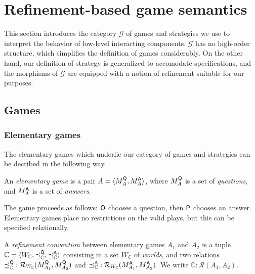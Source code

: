 \section{Refinement-based game semantics}

This section introduces the category $\mathcal{G}$ of games and strategies
we use to interpret the behavior of low-level interacting components.
$\mathcal{G}$ has no high-order structure,
which simplifies the definition of games considerably.
On the other hand,
our definition of strategy is generalized to accomodate specifications,
and the morphisms of $\mathcal{G}$ are equipped with a notion of refinement
suitable for our purposes.

\subsection{Games} %

\subsubsection{Elementary games} %

The elementary games which underlie
our category of games and strategies
can be decribed in the following way.

\begin{definition} %
An \emph{elementary game} is a pair
$A = \langle M_A^{ \mathsf{Q} }, M_A^{ \mathsf{A} } \rangle$, where
$M_A^{ \mathsf{Q} }$ is a set of \emph{questions}, and
$M_A^{ \mathsf{A} }$ is a set of \emph{answers}.
\end{definition}

The game proceeds as follows:
$ \mathsf{O} $ chooses a question, then
$ \mathsf{P} $ chooses an answer.
Elementary games place no restrictions
on the valid plays,
but this can be specified relationally.

\begin{definition} %
A \emph{refinement convention} between elementary games $A_1$ and $A_2$
is a tuple
$\mathbb{C} = \langle W_\mathbb{C}, \preceq_\mathbb{C}^{ \mathsf{Q} }, \preceq_\mathbb{C}^{ \mathsf{A} } \rangle$
consisting in a set $W_\mathbb{C}$ of \emph{worlds},
and two relations
${\preceq}_\mathbb{C}^{ \mathsf{Q} } : \mathcal{R}_{W_\mathbb{C}}(M_{A_1}^{ \mathsf{Q} },M_{A_2}^{ \mathsf{Q} })$ and
${\preceq}_\mathbb{C}^{ \mathsf{A} } : \mathcal{R}_{W_\mathbb{C}}(M_{A_1}^{ \mathsf{A} },M_{A_2}^{ \mathsf{A} })$.
We write $\mathbb{C} : \mathcal{R}(A_1, A_2)$.
\end{definition}

